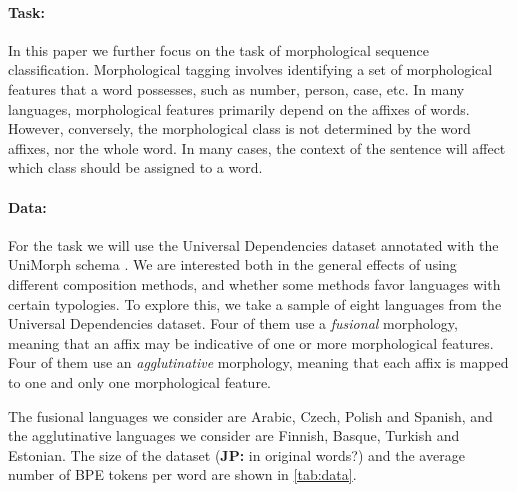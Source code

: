 \documentclass[11pt]{article}
\newcommand\jp[1]{(\textbf{JP:} #1)}
\begin{document}
        \paragraph{Task:} In this paper we further focus on the task
        of morphological sequence classification. Morphological
        tagging involves identifying a set of morphological features
        that a word possesses, such as number, person, case, etc. In
        many languages, morphological features primarily depend on the
        affixes of words. However, conversely, the morphological class
        is not determined by the word affixes, nor the whole word. In
        many cases, the context of the sentence will affect which
        class should be assigned to a word.

        \paragraph{Data:} For the task we will use the Universal
        Dependencies dataset \citep{nivre2018} annotated with the
        UniMorph schema \citep{mccarthy2018marrying}. We are
        interested both in the general effects of using different
        composition methods, and whether some methods favor languages
        with certain typologies. To explore this, we take a sample of
        eight languages from the Universal Dependencies dataset. Four
        of them use a \textit{fusional} morphology, meaning that an
        affix may be indicative of one or more morphological
        features. Four of them use an \textit{agglutinative}
        morphology, meaning that each affix is mapped to one and only
        one morphological feature.
    
   	The fusional languages we consider are Arabic, Czech, Polish
        and Spanish, and the agglutinative languages we consider are
        Finnish, Basque, Turkish and Estonian. The size of the dataset
        \jp{in original words?}  and the average number of BPE tokens
        per word are shown in \cref{tab:data}.
    
\end{document}
